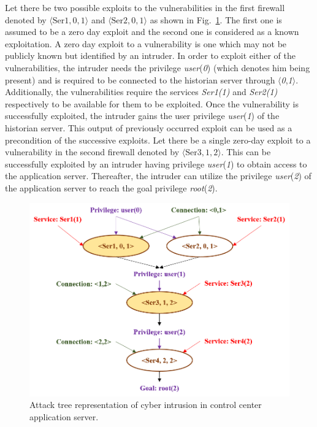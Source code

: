 Let there be two possible exploits to the vulnerabilities in the first firewall denoted by $\langle\textrm{Ser}1,0,1\rangle$ and $\langle\textrm{Ser}2,0,1\rangle$ as shown in Fig.~\ref{fig:attacktree}. The first one is assumed to be a zero day exploit and the second one is considered as a known exploitation. A zero day exploit to a vulnerability is one which may not be publicly known but identified by an intruder. In order to exploit either of the vulnerabilities, the intruder needs the privilege \emph{user}(\emph{0}) (which denotes him being present) and is required to be connected to the historian server through $\langle$\emph{0},\emph{1}$\rangle$. Additionally, the vulnerabilities require the services \emph{Ser1(1)} and \emph{Ser2(1)} respectively to be available for them to be exploited. Once the vulnerability is successfully exploited, the intruder gains the user privilege \emph{user}(\emph{1}) of the historian server. This output of previously occurred exploit can be used as a precondition of the successive exploits. Let there be a single zero-day exploit to a vulnerability in the second firewall denoted by $\langle\textrm{Ser}3,1,2\rangle$. This can be successfully exploited by an intruder having privilege \emph{user}(\emph{1}) to obtain access to the application server. Thereafter, the intruder can utilize the privilege \emph{user}(\emph{2}) of the application server to reach the goal privilege \emph{root}(\emph{2}).
\begin{figure}[htbp]
	\centering
	\includegraphics[scale=0.4]{fig-attacktree.png}
	\caption{Attack tree representation of cyber intrusion in control center application server.}
	\label{fig:attacktree}
\end{figure}
